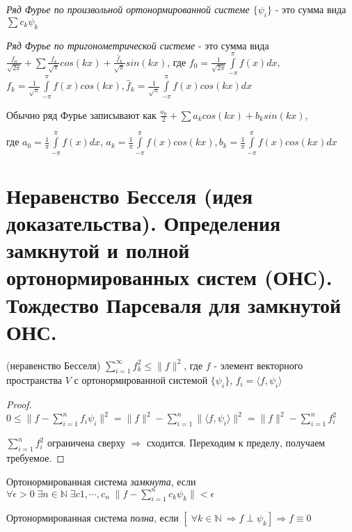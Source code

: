 \documentclass{article}
\begin{document}
	 \begin{definition}
	 	\textit{Ряд Фурье по произвольной ортонормированной системе $\{{\psi_i}\}$} - это сумма вида $\sum c_k \psi_k$
	 \end{definition}
 
	 \begin{definition}
	 	\textit{Ряд Фурье по тригонометрической системе} - это сумма вида $\frac{f_0}{\sqrt{2\pi}} +\sum \frac{f_k}{\sqrt{\pi}}cos(kx) + \frac{\hat f_k}{\sqrt{\pi}}sin(kx)$, где $f_0=\frac{1}{\sqrt{2\pi}}\int\limits_{-\pi}^{\pi} f(x) dx$, $f_k=\frac{1}{\sqrt{\pi}}\int\limits_{-\pi}^{\pi} f(x)cos(kx), \hat f_k=\frac{1}{\sqrt{\pi}}\int\limits_{-\pi}^{\pi} f(x)cos(kx) dx$
	 \end{definition}
 
 	Обычно ряд Фурье записывают как $\frac{a_0}{2} + \sum a_k cos(kx) + b_k sin(kx)$,
 	
 	где $a_0=\frac{1}{\pi}\int\limits_{-\pi}^{\pi} f(x) dx$, $a_k=\frac{1}{\pi}\int\limits_{-\pi}^{\pi} f(x)cos(kx), b_k=\frac{1}{\pi}\int\limits_{-\pi}^{\pi} f(x)cos(kx) dx$
	
	\section{Неравенство Бесселя (идея доказательства). Определения замкнутой и полной ортонормированных систем (ОНС). Тождество Парсеваля для замкнутой ОНС.}
	
	\begin{theorem} 
		(неравенство Бесселя) $\sum_{i=1}^{\infty} f_k^2 \le \| f \|^2$, где $f$ - элемент векторного пространства $V$ с ортонормированной системой $\{{\psi_i}\}$, $f_i = \langle f, \psi_i \rangle$ 
	\end{theorem}
	\begin{proof}
		$0 \le \| f- \sum_{i=1}^{n} f_i \psi_i\|^2=\|f\|^2-\sum_{i=1}^{n} \|\langle f, \psi_i \rangle \|^2=\|f\|^2-\sum_{i=1}^{n} f_i ^2$ 
		
		$\sum_{i=1}^{n} f_i^2$ ограничена сверху $\Rightarrow$  сходится. Переходим к пределу, получаем требуемое. 
	\end{proof}

	\begin{definition}
		Ортонормированная система \textit{замкнута}, если $\forall \epsilon > 0 \; \exists n \in \mathbb{N} \; \exists c1, \cdots, c_n \; \| f-\sum_{i=1}^{n} c_k \psi_k\| < \epsilon$
	\end{definition}

	\begin{definition}
		Ортонормированная система \textit{полна}, если $[\; \forall k \in \mathbb{N} \ \Rightarrow f \perp \psi_k] \Rightarrow f \equiv 0$
	\end{definition}
\end{document}
